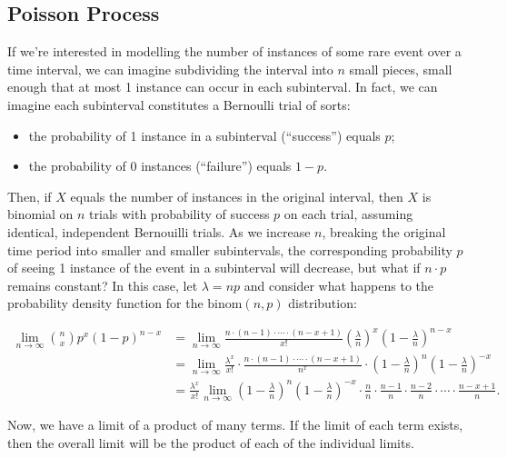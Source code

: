 \documentclass[
]{book}
\providecommand{\tightlist}{%
  \setlength{\itemsep}{0pt}\setlength{\parskip}{0pt}}
\theoremstyle{definition}
\theoremstyle{definition}
\theoremstyle{definition}
\theoremstyle{definition}
\theoremstyle{remark}
\begin{document}
\subsection{Poisson Process}\label{poisson-process}

If we're interested in modelling the number of instances of some rare event over a time interval, we can imagine subdividing the interval into \(n\) small pieces, small enough that at most 1 instance can occur in each subinterval. In fact, we can imagine each subinterval constitutes a Bernoulli trial of sorts:

\begin{itemize}
\tightlist
\item
  the probability of 1 instance in a subinterval (``success'') equals \(p\);
\item
  the probability of 0 instances (``failure'') equals \(1-p\).
\end{itemize}

Then, if \(X\) equals the number of instances in the original interval, then \(X\) is binomial on \(n\) trials with probability of success \(p\) on each trial, assuming identical, independent Bernouilli trials. As we increase \(n\), breaking the original time period into smaller and smaller subintervals, the corresponding probability \(p\) of seeing 1 instance of the event in a subinterval will decrease, but what if \(n \cdot p\) remains constant? In this case, let \(\lambda = np\) and consider what happens to the probability density function for the \(\text{binom}(n,p)\) distribution:

\begin{align*}
\lim_{n \to \infty} \binom{n}{x}p^x(1-p)^{n-x} &= \lim_{n \to \infty} \frac{n\cdot(n-1)\cdot \cdots \cdot (n - x + 1)}{x!} \left(\frac{\lambda}{n}\right)^x\left(1-\frac{\lambda}{n}\right)^{n-x} \\
  &=\lim_{n \to \infty} \frac{\lambda^x}{x!}\cdot\frac{n\cdot(n-1)\cdot \cdots \cdot (n - x + 1)}{n^x}\cdot\left(1-\frac{\lambda}{n}\right)^{n}\left(1-\frac{\lambda}{n}\right)^{-x}\\
  &=\frac{\lambda^x}{x!}\lim_{n \to \infty}\left(1-\frac{\lambda}{n}\right)^{n}\left(1-\frac{\lambda}{n}\right)^{-x} \cdot \frac{n}{n} \cdot \frac{n-1}{n} \cdot \frac{n-2}{n} \cdot \cdots \cdot \frac{n-x+1}{n}.
\end{align*}

Now, we have a limit of a product of many terms. If the limit of each term exists, then the overall limit will be the product of each of the individual limits.
\end{document}
